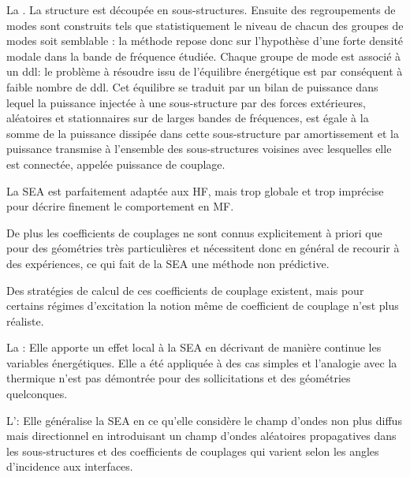 \bigskip
La .
La structure est découpée en sous-structures.
Ensuite des regroupements de modes sont construits tels que statistiquement le niveau
de chacun des groupes de modes soit semblable : la méthode repose donc sur l'hypothèse
d'une forte densité modale dans la bande de fréquence étudiée.
Chaque groupe de mode est associé à un ddl: le problème à résoudre issu
de l'équilibre énergétique est par conséquent à faible nombre de ddl.
Cet équilibre se traduit par un bilan de puissance dans lequel la puissance injectée
à une sous-structure par des forces extérieures, aléatoires et stationnaires sur de
larges bandes de fréquences, est égale à la somme de la puissance dissipée
dans cette sous-structure par amortissement et la puissance transmise à l'ensemble
des sous-structures voisines avec lesquelles elle est connectée, appelée puissance
de couplage.

La SEA est parfaitement adaptée aux HF, mais trop globale et trop imprécise pour
décrire finement le comportement en MF.

De plus les coefficients de couplages ne sont connus explicitement à priori que pour
des géométries très particulières et nécessitent donc en général de recourir
à des expériences, ce qui fait de la SEA une méthode non prédictive.

Des stratégies de calcul de ces coefficients de couplage existent, mais pour certains
régimes d'excitation la notion même de coefficient de couplage n'est plus réaliste.

\bigskip
La : 
Elle apporte un effet local à la SEA en décrivant de manière continue les variables
énergétiques. Elle a été appliquée à des cas simples et l'analogie avec la thermique
n'est pas démontrée pour des sollicitations et des géométries quelconques.

\bigskip
L': 
Elle généralise la SEA en ce qu'elle considère le champ d'ondes non plus diffus mais
directionnel en introduisant un champ d'ondes aléatoires propagatives dans les
sous-structures et des coefficients de couplages qui varient selon les angles
d'incidence aux interfaces.

